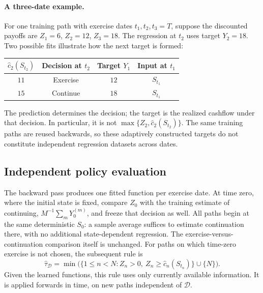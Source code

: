 \documentclass[11pt,a4paper]{article}
\begin{document}
\paragraph{A three-date example.}
For one training path with exercise dates $t_1,t_2,t_3=T$, suppose the
discounted payoffs are $Z_1=6$, $Z_2=12$, $Z_3=18$.
The regression at $t_2$ uses target $Y_2=18$. Two possible fits illustrate
how the next target is formed:
\begin{center}
\begin{tabular}{cccc}
\toprule
$\widehat c_2(S_{t_2})$ & Decision at $t_2$ & Target $Y_1$ & Input at $t_1$\\
\midrule
$11$ & Exercise & $12$ & $S_{t_1}$\\
$15$ & Continue & $18$ & $S_{t_1}$\\
\bottomrule
\end{tabular}
\end{center}
The prediction determines the decision; the target is the realized cashflow
under that decision. In particular, it is not $\max\{Z_2,\widehat c_2(S_{t_2})\}$.
The same training paths are reused backwards, so these adaptively constructed
targets do not constitute independent regression datasets across dates.

\subsection{Independent policy evaluation}
The backward pass produces one fitted function per exercise date. At time zero,
where the initial state is fixed, compare $Z_0$ with the training estimate of
continuing, $M^{-1}\sum_mY_0^{(m)}$, and freeze that decision as well.
All paths begin at the same deterministic $S_0$: a sample average suffices to
estimate continuation there, with no additional state-dependent regression.
The exercise-versus-continuation comparison itself is unchanged.
For paths on which time-zero exercise is not chosen, the subsequent rule is
\begin{equation}
 \widehat\tau_{\mathcal D}
 =\min\bigl(\{1\leq n<N:Z_n>0,\
 Z_n\geq\widehat c_n(S_{t_n})\}\cup\{N\}\bigr).
\end{equation}
Given the learned functions, this rule uses only currently available information.
It is applied forwards in time, on new paths independent of $\mathcal D$.
\end{document}
